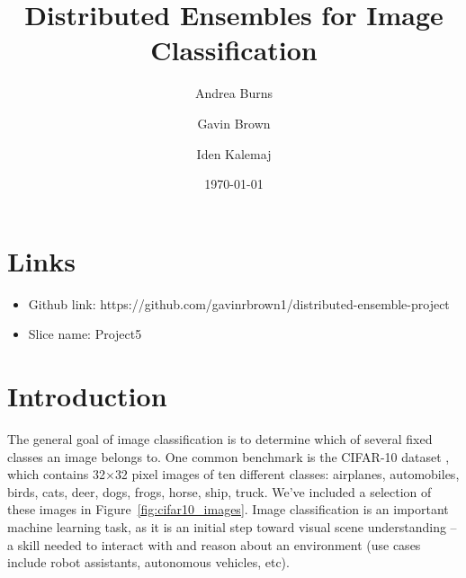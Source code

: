 \documentclass[12pt]{article}
\title{Distributed Ensembles for Image Classification}
\author{Andrea Burns \and Gavin Brown \and Iden Kalemaj}
\date{\today}
\begin{document}
\maketitle
\section{Links}
\begin{itemize}
	\item Github link: https://github.com/gavinrbrown1/distributed-ensemble-project
	\item Slice name: Project5
\end{itemize}

\section{Introduction}

The general goal of image classification is to determine which of several fixed classes an image belongs to. 
One common benchmark is the CIFAR-10 dataset \cite{cifar10}, which contains 32$\times$32 pixel images of ten different classes: airplanes, automobiles, birds, cats, deer, dogs, frogs, horse, ship, truck.
We've included a selection of these images in Figure~\ref{fig:cifar10_images}.
Image classification is an important machine learning task, as it is an initial step toward visual scene understanding -- a skill needed to interact with and reason about an environment (use cases include robot assistants, autonomous vehicles, etc).
\end{document}

